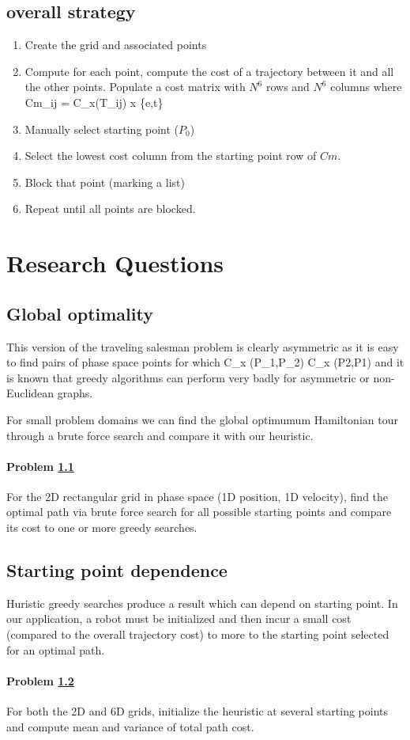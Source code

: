 \documentclass[letterpaper]{article}
\begin{document}
\subsection{overall strategy}

\begin{enumerate}
  \item Create the grid and associated points
  \item Compute for each point, compute the cost of a trajectory between it and all the other points.  Populate
  a cost matrix with $N^6$ rows and $N^6$ columns where
  \beq
    Cm_{ij} = C_x(T_{ij})  \qquad    x \in \{e,t\}
  \eeq
  \item Manually select starting point ($P_0$)
  \item Select the lowest cost column from the starting point row of $Cm$.
  \item Block that point (marking a list)
  \item Repeat until all points are blocked.
\end{enumerate}


\section{Research Questions}


\subsection{Global optimality}\label{prob:global}

This version of the traveling salesman problem is clearly asymmetric as it is
easy to find pairs of phase space points for which
\beq
C_x (P_1,P_2) \neq C_x (P2,P1)
\eeq
and it is known \cite{}  that greedy algorithms can perform very badly for asymmetric or
non-Euclidean graphs.

For small problem domains we can find the global optimumum Hamiltonian tour
through a brute force search and compare it with our heuristic.

\paragraph{Problem \ref{prob:global}}
For the 2D rectangular grid in phase space (1D position, 1D velocity),
find the optimal path via brute force search for all possible starting points
and compare its cost to
one or more greedy searches.

\subsection{Starting point dependence}\label{prob:startingpt}
Huristic greedy searches produce a result which can depend on starting point.
In our application, a robot must be initialized and then incur a small cost
(compared to the overall trajectory cost) to more to the starting point
selected for an optimal path.

\paragraph{Problem \ref{prob:startingpt}}
For both the 2D and 6D grids, initialize the heuristic at several starting
points and compute
mean and variance of total path cost.
\end{document}
